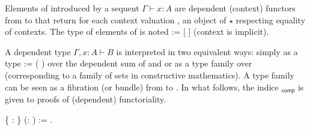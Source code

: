 \begin{coqdoccode}
\end{coqdoccode}
Elements of  introduced by a sequent $\Gamma \vdash x:A$ are
  dependent (context) functors from  to  that return for each
  context valuation \coqdocvariable{$\gamma$}, an object of  $\star$ \coqdocvariable{$\gamma$} respecting equality of
  contexts.  The type of elements of  is noted   := [\coqdocdefinition{$\Pi$} ]
  (context is implicit).  

  A dependent type $\Gamma, x:A \vdash B$ is interpreted in two
  equivalent ways: simply as a type   :=  (\coqdocdefinition{$\Sigma$} ) over the
  dependent sum of  and  or as a type family   over 
  (corresponding to a family of sets in constructive mathematics). A
  type family can be seen as a fibration (or bundle) from  to .
  In what follows, the indice $\mathsf{_{comp}}$ is given to proofs of 
  (dependent) functoriality.
\begin{coqdoccode}
\coqdocemptyline
\coqdocnoindent
{}  \{ : \} (:  ) := \coqdoceol
\coqdocindent{1.00em}
\coqdocnotation{[}\coqdocdefinition{$\Pi$} \coqdocnotation{(} \coqdocvar{$\gamma$} \coqdocnotation{ } \coqdocnotation{(} \coqdocnotation{$\star$} \coqdocvariable{$\gamma$}\coqdocnotation{)}  \coqdocnotation{$\longrightarrow$} \coqdocnotation{;}  \coqdocvar{\_}\coqdocnotation{)}\coqdocnotation{]}.\coqdoceol
\coqdocemptyline
\end{coqdoccode}


